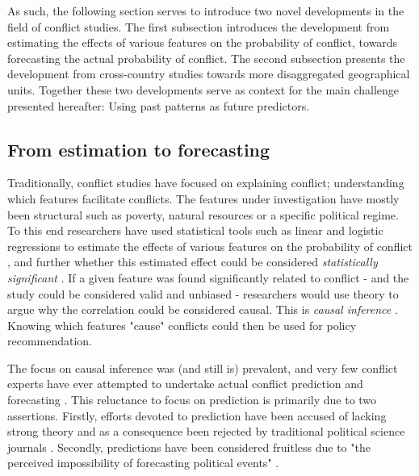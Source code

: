 \documentclass[a4paper]{article}
\begin{document}
As such, the following section serves to introduce two novel developments in the field of conflict studies. The first subsection introduces the development from estimating the effects of various features on the probability of conflict, towards forecasting the actual probability of conflict. The second subsection presents the development from cross-country studies towards more disaggregated geographical units. Together these two developments serve as context for the main challenge presented hereafter: Using past patterns as future predictors.\par


\subsection{From estimation to forecasting}\label{est_to_pred} %


Traditionally, conflict studies have focused on explaining conflict; understanding which features facilitate conflicts. The features under investigation have mostly been structural such as poverty, natural resources or a specific political regime. To this end researchers have used statistical tools such as linear and logistic regressions to estimate the effects of various features on the probability of conflict \citep[8]{chadefaux2017conflict}, and further whether this estimated effect could be considered \emph{statistically significant} \citep[363-364]{Ward_Greenhill_Bakke_2010}. If a given feature was found significantly related to conflict - and the study could be considered valid and unbiased - researchers would use theory to argue why the correlation could be considered causal. This is \emph{causal inference} \citep[8]{chadefaux2017conflict}. Knowing which features "cause" conflicts could then be used for policy recommendation.\par

The focus on causal inference was (and still is) prevalent, and very few conflict experts have ever attempted to undertake actual conflict prediction and forecasting \citep[474]{cederman2017predicting}. This reluctance to focus on prediction is primarily due to two assertions. Firstly, efforts devoted to prediction have been accused of lacking strong theory and as a consequence been rejected by traditional political science journals \citep[8-9]{chadefaux2017conflict}. Secondly, predictions have been considered fruitless due to "the perceived impossibility of forecasting political events" \citep[8]{chadefaux2017conflict}.
\end{document}
